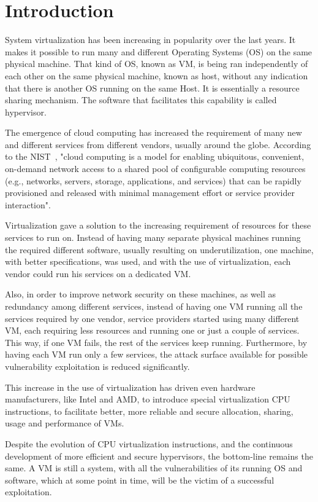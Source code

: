 \chapter{Introduction}\label{ch:intro}

System virtualization has been increasing in popularity over the last years. It makes it possible to run many and different Operating Systems (OS) on the same physical machine. That kind of \ac{OS}, known as \ac{VM}, is being ran independently of each other on the same physical machine, known as host, without any indication that there is another \ac{OS} running on the same Host. It is essentially a resource sharing mechanism. The software that facilitates this capability is called hypervisor.
\par The emergence of cloud computing has increased the requirement of many new and different services from different vendors, usually around the globe. According to the \ac{NIST}~\cite{mell2011nist}, "cloud computing is a model for enabling ubiquitous, convenient, on-demand network access to a shared pool of configurable computing resources (e.g., networks, servers, storage, applications, and services) that can be rapidly provisioned and released with minimal management effort or service provider interaction".  
\par Virtualization gave a solution to the increasing requirement of resources for these services to run on. Instead of having many separate physical machines running the required different software, usually resulting on underutilization, one machine, with better specifications, was used, and with the use of virtualization, each vendor could run his services on a dedicated \ac{VM}. 
\par Also, in order to improve network security on these machines, as well as redundancy among different services, instead of having one VM running all the services required by one vendor, service providers started using many different \ac{VM}, each requiring less resources and running one or just a couple of services. This way, if one VM fails, the rest of the services keep running. Furthermore, by having each \ac{VM} run only a few services, the attack surface available for possible vulnerability exploitation is reduced significantly.
\par This increase in the use of virtualization has driven even hardware manufacturers, like Intel and AMD, to introduce special virtualization \ac{CPU} instructions, to facilitate better, more reliable and secure allocation, sharing, usage and performance of \ac{VM}s. 
\par Despite the evolution of \ac{CPU} virtualization instructions, and the continuous development of more efficient and secure hypervisors, the bottom-line remains the same. A \ac{VM} is still a system, with all the vulnerabilities of its running \ac{OS} and software, which at some point in time, will be the victim of a successful exploitation. 

